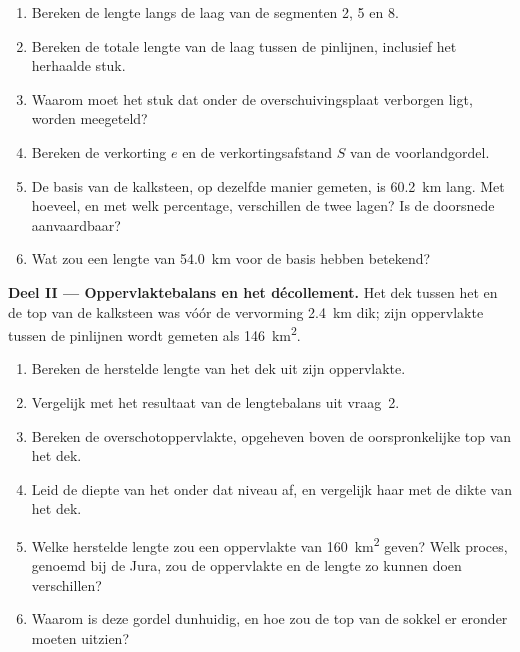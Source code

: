 \begin{problem}
\begin{enumerate}
\item Bereken de lengte langs de laag van de segmenten 2, 5 en 8.
\item Bereken de totale lengte van de laag tussen de pinlijnen, inclusief het herhaalde
stuk.
\item Waarom moet het stuk dat onder de overschuivingsplaat verborgen ligt, worden meegeteld?
\item Bereken de verkorting $e$ en de verkortingsafstand $S$ van de voorlandgordel.
\item De basis van de kalksteen, op dezelfde manier gemeten, is \qty{60.2}{km} lang. Met hoeveel,
en met welk percentage, verschillen de twee lagen? Is de doorsnede aanvaardbaar?
\item Wat zou een lengte van \qty{54.0}{km} voor de basis hebben betekend?
\end{enumerate}

\noindent\textbf{Deel II --- Oppervlaktebalans en het décollement.} Het dek tussen het
 en de top van de kalksteen was vóór de vervorming \qty{2.4}{km} dik; zijn
oppervlakte tussen de pinlijnen wordt gemeten als \qty{146}{km^2}.
\begin{enumerate}[resume]
\item Bereken de herstelde lengte van het dek uit zijn oppervlakte.
\item Vergelijk met het resultaat van de lengtebalans uit vraag~2.
\item Bereken de overschotoppervlakte, opgeheven boven de oorspronkelijke top van het dek.
\item Leid de diepte van het  onder dat niveau af, en vergelijk haar met de dikte
van het dek.
\item Welke herstelde lengte zou een oppervlakte van \qty{160}{km^2} geven? Welk proces,
genoemd bij de Jura, zou de oppervlakte en de lengte zo kunnen doen verschillen?
\item Waarom is deze gordel dunhuidig, en hoe zou de top van de sokkel er
eronder moeten uitzien?
\end{enumerate}


\end{problem}
